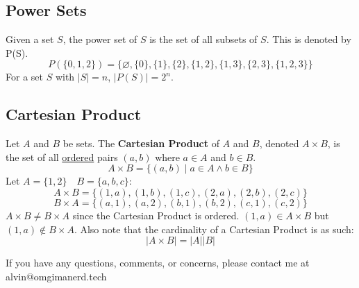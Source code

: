 \documentclass[letterpaper, 12pt]{math}
\begin{document}
\subsection*{Power Sets}
Given a set \( S \), the power set of \( S \) is the set of all subsets of
\( S \). This is denoted by P(S).
\[ P(\{0,1,2\}) = \{ \varnothing, \{0\}, \{1\}, \{2\}, \{1,2\}, \{1,3\}, \{2,3\},
   \{1,2,3\}\} \]
For a set \( S \) with \( |S| = n \), \( |P(S)| = 2^{n} \).

\subsection*{Cartesian Product}
Let \( A \) and \( B \) be sets. The \textbf{Cartesian Product} of \( A \) and
\( B \), denoted \( A \times B \), is the set of all \underline{ordered} pairs
\( (a, b) \) where \( a \in A \) and \( b \in B \).
\[ A \times B = \{(a,b)\mid a \in A \wedge b \in B\} \]
Let \( A = \{1,2\} \quad B = \{a,b,c\} \):
\[ A \times B = \{(1,a),(1,b),(1,c),(2,a),(2,b),(2,c)\} \]
\[ B \times A = \{(a,1),(a,2),(b,1),(b,2),(c,1),(c,2)\} \]
\( A \times B \neq B \times A \) since the Cartesian Product is ordered.
\( (1,a) \in A \times B \) but \( (1,a) \notin B \times A \).
Also note that the cardinality of a Cartesian Product is as such:
\[ |A \times B| = |A||B| \]

\begin{center}
  If you have any questions, comments, or concerns, please contact me at
  alvin@omgimanerd.tech
\end{center}
\end{document}

